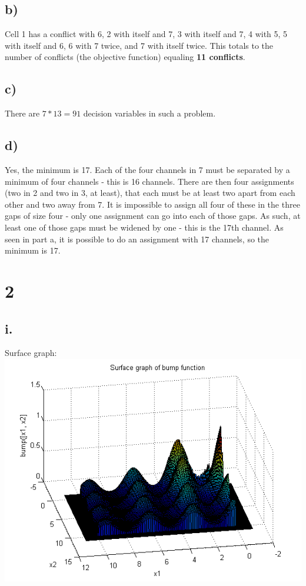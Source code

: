 \documentclass[12pt]{article}
\begin{document}
\subsection{b)}
Cell 1 has a conflict with 6, 2 with itself and 7, 3 with itself and 7, 4 with 5, 5 with itself and 6, 6 with 7 twice, and 7 with itself twice. This totals to the number of conflicts (the objective function) equaling \textbf{11 conflicts}.

\subsection{c)}
There are $7 * 13 = 91$ decision variables in such a problem.

\subsection{d)}
Yes, the minimum is 17. Each of the four channels in 7 must be separated by a minimum of four channels - this is 16 channels. There are then four assignments (two in 2 and two in 3, at least), that each must be at least two apart from  each other and two away from 7. It is impossible to assign all four of these in the three gaps of size four - only one assignment can go into each of those gaps. As such, at least one of those gaps must be widened by one - this is the 17th channel. As seen in part a, it is possible to do an assignment with 17 channels, so the minimum is 17.

\newpage
\section{2}
\subsection{i.}
Surface graph:\\
\includegraphics[height=10cm]{surface.png}
\end{document}
